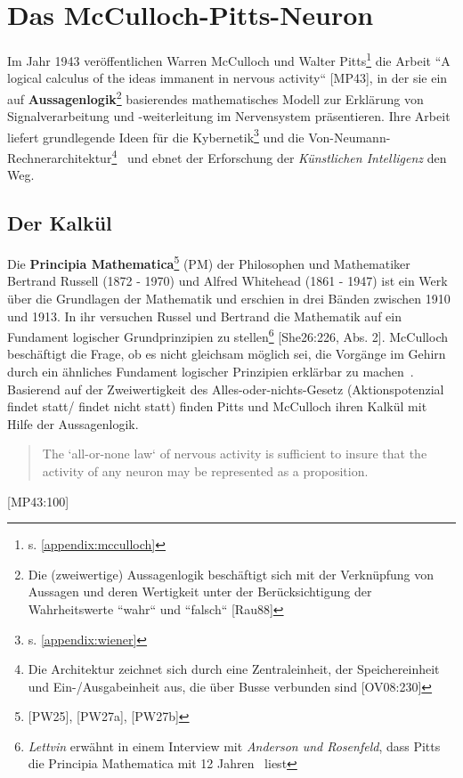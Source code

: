 \section{Das McCulloch-Pitts-Neuron}

Im Jahr 1943 veröffentlichen Warren McCulloch und Walter Pitts\footnote{
    s. \ref{appendix:mcculloch}
} die Arbeit ``A logical calculus of the ideas immanent in nervous activity`` [MP43], in der sie ein auf \textbf{Aussagenlogik}\footnote{
    Die (zweiwertige) Aussagenlogik beschäftigt sich mit der Verknüpfung von Aussagen und deren Wertigkeit unter der Berücksichtigung der Wahrheitswerte ``wahr`` und ``falsch`` [Rau88]
} basierendes mathematisches Modell zur Erklärung von Signalverarbeitung und  -weiterleitung im Nervensystem präsentieren.
Ihre Arbeit liefert grundlegende Ideen für die Kybernetik\footnote{
    s. \ref{appendix:wiener}
} und die Von-Neumann-Rechnerarchitektur\footnote{
    Die Architektur zeichnet sich durch eine Zentraleinheit, der Speichereinheit und Ein-/Ausgabeinheit aus, die über Busse verbunden sind [OV08:230]
}~\cite[1]{Arb19} und ebnet der Erforschung der \textit{Künstlichen Intelligenz} den Weg.


\subsection{Der Kalkül}

Die \textbf{Principia Mathematica}\footnote{
    [PW25], [PW27a], [PW27b]
} (PM) der Philosophen und Mathematiker Bertrand Russell (1872 - 1970) und Alfred Whitehead (1861 - 1947) ist ein Werk über die Grundlagen der Mathematik und erschien in drei Bänden zwischen 1910 und 1913. In ihr versuchen Russel und Bertrand die Mathematik auf ein Fundament logischer Grundprinzipien zu stellen\footnote{
    \textit{Lettvin} erwähnt in einem Interview mit \textit{Anderson und Rosenfeld}, dass Pitts die Principia Mathematica mit 12 Jahren~\cite[2]{AR98} liest
} [She26:226, Abs. 2].
McCulloch beschäftigt die Frage, ob es nicht gleichsam möglich sei, die Vorgänge im Gehirn durch ein ähnliches Fundament logischer Prinzipien erklärbar zu machen~\cite[4]{Arb19}. Basierend auf der Zweiwertigkeit des Alles-oder-nichts-Gesetz (Aktionspotenzial findet statt/ findet nicht statt) finden Pitts und McCulloch ihren Kalkül mit Hilfe der Aussagenlogik.\\

\blockquote{
    The `all-or-none law` of nervous activity is sufficient to insure that the activity of any neuron may be represented as a proposition.
}[MP43:100]\\

